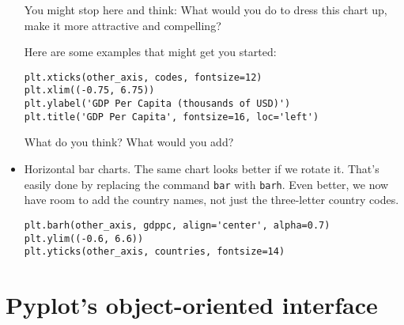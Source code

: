 \documentclass[11pt]{article}
\begin{document}
\begin{itemize}
You might stop here and think:  What would you do to dress this chart up,
make it more attractive and compelling?

Here are some examples that might get you started:
\begin{verbatim}
plt.xticks(other_axis, codes, fontsize=12)
plt.xlim((-0.75, 6.75))
plt.ylabel('GDP Per Capita (thousands of USD)')
plt.title('GDP Per Capita', fontsize=16, loc='left')
\end{verbatim}
What do you think?  What would you add?

\item Horizontal bar charts.
The same chart looks better if we rotate it.
That's easily done by replacing the command {\tt bar} with {\tt barh}.
Even better, we now have room to add the country names, not just the three-letter
country codes.
\begin{verbatim}
plt.barh(other_axis, gdppc, align='center', alpha=0.7)
plt.ylim((-0.6, 6.6))
plt.yticks(other_axis, countries, fontsize=14)
\end{verbatim}

\end{itemize}



\section{Pyplot's object-oriented interface}
\end{document}
